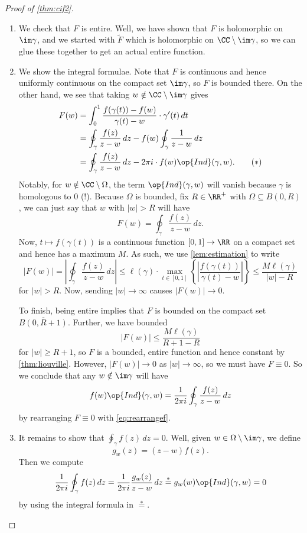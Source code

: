 \begin{proof}[Proof of \autoref{thm:cif2}]
\begin{enumerate}
		\item We check that $F$ is entire. Well, we have shown that $F$ is holomorphic on $\im\gamma$, and we started with $\widetilde F$ which is holomorphic on $\CC\setminus\im\gamma$, so we can glue these together to get an actual entire function.

		\item We show the integral formulae. Note that $F$ is continuous and hence uniformly continuous on the compact set $\im\gamma$, so $F$ is bounded there. On the other hand, we see that taking $w\notin\CC\setminus\im\gamma$ gives
		\begin{align*}
			F(w) &= \int_0^1\frac{f(\gamma(t))-f(w)}{\gamma(t)-w}\cdot\gamma'(t)\,dt \\
			&= \oint_\gamma\frac{f(z)}{z-w}\,dz-f(w)\oint_\gamma\frac1{z-w}\,dz \\
			&= \oint_\gamma\frac{f(z)}{z-w}\,dz-2\pi i\cdot f(w)\op{Ind}(\gamma,w).\tag{$*$}\label{eq:rearrangef}
		\end{align*}
		Notably, for $w\notin\CC\setminus\Omega$, the term $\op{Ind}(\gamma,w)$ will vanish because $\gamma$ is homologous to $0$ (!). Because $\Omega$ is bounded, fix $R\in\RR^+$ with $\Omega\subseteq B(0,R)$, we can just say that $w$ with $|w|>R$ will have
		\[F(w)=\oint_\gamma\frac{f(z)}{z-w}\,dz.\]
		Now, $t\mapsto f(\gamma(t))$ is a continuous function $[0,1]\to\RR$ on a compact set and hence has a maximum $M$. As such, we use \autoref{lem:estimation} to write
		\[|F(w)|=\left|\oint_\gamma\frac{f(z)}{z-w}\,dz\right|\le\ell(\gamma)\cdot\max_{t\in[0,1]}\left\{\left|\frac{f(\gamma(t))}{\gamma(t)-w}\right|\right\}\le\frac{M\ell(\gamma)}{|w|-R}\]
		for $|w|>R$. Now, sending $|w|\to\infty$ causes $|F(w)|\to0$.

		To finish, being entire implies that $F$ is bounded on the compact set $\overline{B(0,R+1)}$. Further, we have bounded
		\[|F(w)|\le\frac{M\ell(\gamma)}{R+1-R}\]
		for $|w|\ge R+1$, so $F$ is a bounded, entire function and hence constant by \autoref{thm:liouville}. However, $|F(w)|\to0$ as $|w|\to\infty$, so we must have $F\equiv0$. So we conclude that any $w\notin\im\gamma$ will have
		\[f(w)\op{Ind}(\gamma,w)=\frac1{2\pi i}\oint_\gamma\frac{f(z)}{z-w}\,dz\]
		by rearranging $F\equiv0$ with \autoref{eq:rearrangef}.

		\item It remains to show that $\oint_\gamma f(z)\,dz=0$. Well, given $w\in\Omega\setminus\im\gamma$, we define
		\[g_w(z)=(z-w)f(z).\]
		Then we compute
		\[\frac1{2\pi i}\oint_\gamma f(z)\,dz=\frac1{2\pi i}\frac{g_w(z)}{z-w}\,dz\stackrel*=g_w(w)\op{Ind}(\gamma,w)=0\]
		by using the integral formula in $\stackrel*=$.
		\qedhere
	\end{enumerate}
\end{proof}
